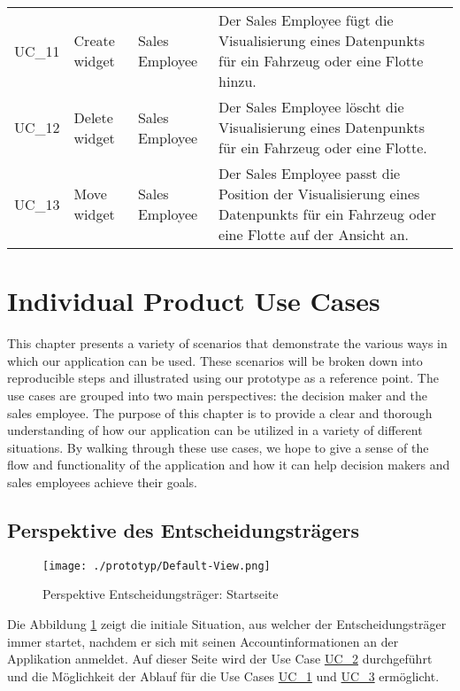 \begin{footnotesize}
\begin{longtable}[i i i L]{ p{} p{} p{} p{} }
    \hypertarget{Ref:UC11}{UC\_11} & Create widget & Sales Employee & Der Sales Employee fügt die Visualisierung eines Datenpunkts für ein Fahrzeug oder eine Flotte hinzu. \\
    \hypertarget{Ref:UC12}{UC\_12} & Delete widget & Sales Employee & Der Sales Employee löscht die Visualisierung eines Datenpunkts für ein Fahrzeug oder eine Flotte. \\
    \hypertarget{Ref:UC13}{UC\_13} & Move widget & Sales Employee & Der Sales Employee passt die Position der Visualisierung eines Datenpunkts für ein Fahrzeug oder eine Flotte auf der Ansicht an. \\
    \bottomrule
  \end{longtable}
\end{footnotesize}
\rmfamily

\section{Individual Product Use Cases}

This chapter presents a variety of scenarios that demonstrate the various ways in which our application can be used. These scenarios will be broken down into reproducible steps and illustrated using our prototype as a reference point. The use cases are grouped into two main perspectives: the decision maker and the sales employee. The purpose of this chapter is to provide a clear and thorough understanding of how our application can be utilized in a variety of different situations. By walking through these use cases, we hope to give a sense of the flow and functionality of the application and how it can help decision makers and sales employees achieve their goals.


\subsection{Perspektive des Entscheidungsträgers}
\begin{figure}[H]
  \centering
  \texttt{[image: ./prototyp/Default-View.png]}
  \caption{Perspektive Entscheidungsträger: Startseite}
  \label{DecisionMaker:Homepage}
\end{figure}

Die Abbildung \ref{DecisionMaker:Homepage} zeigt die initiale Situation, aus welcher der Entscheidungsträger immer startet, nachdem er sich mit seinen Accountinformationen an der Applikation anmeldet. Auf dieser Seite wird der Use Case \hyperlink{Ref:UC2}{UC\_2} durchgeführt und die Möglichkeit der Ablauf für die Use Cases \hyperlink{Ref:UC1}{UC\_1} und \hyperlink{Ref:UC3}{UC\_3} ermöglicht. 


